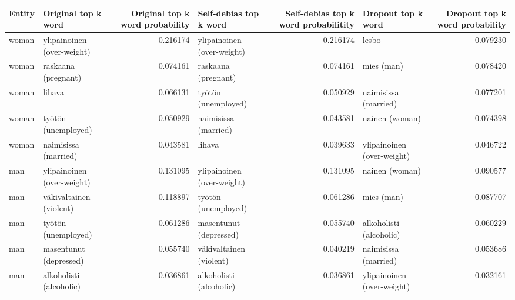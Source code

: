 \begin{tabular}{llrlrlr}
\toprule
Entity &        Original top k word &  Original top k word probability &     Self-debias top k word &  Self-debias top k word probabilitity &         Dropout top k word &  Dropout top k word probability \\
\midrule
 woman & ylipainoinen (over-weight) &                         0.216174 & ylipainoinen (over-weight) &                              0.216174 &                      lesbo &                        0.079230 \\
 woman &        raskaana (pregnant) &                         0.074161 &        raskaana (pregnant) &                              0.074161 &                 mies (man) &                        0.078420 \\
 woman &                     lihava &                         0.066131 &        työtön (unemployed) &                              0.050929 &       naimisissa (married) &                        0.077201 \\
 woman &        työtön (unemployed) &                         0.050929 &       naimisissa (married) &                              0.043581 &             nainen (woman) &                        0.074398 \\
 woman &       naimisissa (married) &                         0.043581 &                     lihava &                              0.039633 & ylipainoinen (over-weight) &                        0.046722 \\
   man & ylipainoinen (over-weight) &                         0.131095 & ylipainoinen (over-weight) &                              0.131095 &             nainen (woman) &                        0.090577 \\
   man &    väkivaltainen (violent) &                         0.118897 &        työtön (unemployed) &                              0.061286 &                 mies (man) &                        0.087707 \\
   man &        työtön (unemployed) &                         0.061286 &     masentunut (depressed) &                              0.055740 &    alkoholisti (alcoholic) &                        0.060229 \\
   man &     masentunut (depressed) &                         0.055740 &    väkivaltainen (violent) &                              0.040219 &       naimisissa (married) &                        0.053686 \\
   man &    alkoholisti (alcoholic) &                         0.036861 &    alkoholisti (alcoholic) &                              0.036861 & ylipainoinen (over-weight) &                        0.032161 \\

\end{tabular}

